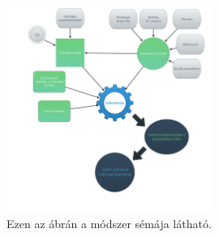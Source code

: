 \begin{figure}[h!]
	\centering
	\includegraphics[width=0.6\textwidth]{./fig/method.pdf}
	\caption[Módszer sémája]{Ezen az ábrán a módszer sémája látható.}%
	\label{fig:method}
\end{figure}


